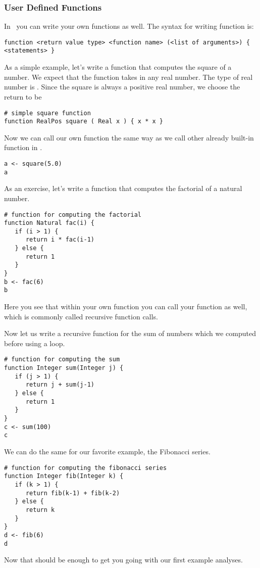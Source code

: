 \subsubsection{User Defined Functions}
In \Rev~you can write your own functions as well.
The syntax for writing function is:
{\tt \begin{snugshade*}
\begin{lstlisting}    
function <return value type> <function name> (<list of arguments>) { <statements> }
\end{lstlisting}
\end{snugshade*}}
As a simple example, let's write a function that computes the square of a number.
We expect that the function takes in any real number.
The type of real number is .
Since the square is always a positive real number, we choose the return to be 
{\tt \begin{snugshade*}
\begin{lstlisting}    
# simple square function
function RealPos square ( Real x ) { x * x }
\end{lstlisting}
\end{snugshade*}}
Now we can call our own function the same way as we call other already built-in function in \RevBayes.
{\tt \begin{snugshade*}
\begin{lstlisting}    
a <- square(5.0)
a
\end{lstlisting}
\end{snugshade*}}
As an exercise, let's write a function that computes the factorial of a natural number.
{\tt \begin{snugshade*}
\begin{lstlisting}    
# function for computing the factorial
function Natural fac(i) {
   if (i > 1) {
      return i * fac(i-1)
   } else {
      return 1
   }
}
b <- fac(6)
b
\end{lstlisting}
\end{snugshade*}}
Here you see that within your own function you can call your function as well, which is commonly called recursive function calls.

Now let us write a recursive function for the sum of numbers which we computed before using a  loop.
{\tt \begin{snugshade*}
\begin{lstlisting}    
# function for computing the sum
function Integer sum(Integer j) {
   if (j > 1) {
      return j + sum(j-1)
   } else {
      return 1
   }
}
c <- sum(100)
c
\end{lstlisting}
\end{snugshade*}}
We can do the same for our favorite example, the Fibonacci series.
{\tt \begin{snugshade*}
\begin{lstlisting}    
# function for computing the fibonacci series
function Integer fib(Integer k) {
   if (k > 1) {
      return fib(k-1) + fib(k-2)
   } else {
      return k
   }
}
d <- fib(6)
d
\end{lstlisting}
\end{snugshade*}}
Now that should be enough to get you going with our first example analyses.




